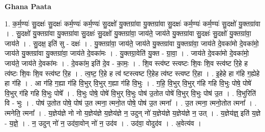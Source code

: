 \documentclass[17pt]{extarticle}
\begin{document}
\textbf{Ghana Paata } \newline

1. क॒र्म॒ण्यः॑ सु॒दक्षः॑ सु॒दक्षः॑ कर्म॒ण्यः॑ कर्म॒ण्यः॑ सु॒दक्षो॑ यु॒क्तग्रा॑वा यु॒क्तग्रा॑वा सु॒दक्षः॑ कर्म॒ण्यः॑ कर्म॒ण्यः॑ सु॒दक्षो॑ यु॒क्तग्रा॑वा । . सु॒दक्षो॑ यु॒क्तग्रा॑वा यु॒क्तग्रा॑वा सु॒दक्षः॑ सु॒दक्षो॑ यु॒क्तग्रा॑वा॒ जाय॑ते॒ जाय॑ते यु॒क्तग्रा॑वा सु॒दक्षः॑ सु॒दक्षो॑ यु॒क्तग्रा॑वा॒ जाय॑ते । . सु॒दक्ष॒ इति॑ सु - दक्षः॑ । . यु॒क्तग्रा॑वा॒ जाय॑ते॒ जाय॑ते यु॒क्तग्रा॑वा यु॒क्तग्रा॑वा॒ जाय॑ते दे॒वका॑मो दे॒वका॑मो॒ जाय॑ते यु॒क्तग्रा॑वा यु॒क्तग्रा॑वा॒ जाय॑ते दे॒वका॑मः । . यु॒क्तग्रा॒वेति॑ यु॒क्त - ग्रा॒वा॒ । . जाय॑ते दे॒वका॑मो दे॒वका॑मो॒ जाय॑ते॒ जाय॑ते दे॒वका॑मः । . दे॒वका॑म॒ इति॑ दे॒व - का॒मः॒ । . शि॒व स्त्व॑ष्ट स्त्वष्टः शि॒वः शि॒व स्त्व॑ष्ट रि॒हे ह त्व॑ष्टः शि॒वः शि॒व स्त्व॑ष्ट रि॒ह । . त्व॒ष्ट॒ रि॒हे ह त्व॑ ष्टस्त्वष्ट रि॒हेह त्व॑ष्ट स्त्वष्ट रि॒हा । . इ॒हेहे हा ग॑हि ग॒ह्येहे हा ग॑हि । . आ ग॑हि ग॒ह्या ग॑हि वि॒भुर् वि॒भुर् ग॒ह्या ग॑हि वि॒भुः । . ग॒हि॒ वि॒भुर् वि॒भुर् ग॑हि गहि वि॒भुः पोषे॒ पोषे॑ वि॒भुर् ग॑हि गहि वि॒भुः पोषे᳚ । . वि॒भुः पोषे॒ पोषे॑ वि॒भुर् वि॒भुः पोष॑ उ॒तोत पोषे॑ वि॒भुर् वि॒भुः पोष॑ उ॒त । . वि॒भुरिति॑ वि - भुः । . पोष॑ उ॒तोत पोषे॒ पोष॑ उ॒त त्मना॒ त्मनो॒त पोषे॒ पोष॑ उ॒त त्मना᳚ । . उ॒त त्मना॒ त्मनो॒तोत त्मना᳚ । . त्मनेति॒ त्मना᳚ । . य॒ज्ञेय॑ज्ञे नो नो य॒ज्ञेय॑ज्ञे य॒ज्ञेय॑ज्ञे न॒ उदुन् नो॑ य॒ज्ञेय॑ज्ञे य॒ज्ञेय॑ज्ञे न॒ उत् । . य॒ज्ञेय॑ज्ञ्॒ इति॑ य॒ज्ञे - य॒ज्ञे॒ । . न॒ उदुन् नो॑ न॒ उद॑वा॒वोन् नो॑ न॒ उद॑व । . उद॑वा॒ वोदुद॑व । . अ॒वेत्य॑व । \newline
\end{document}
